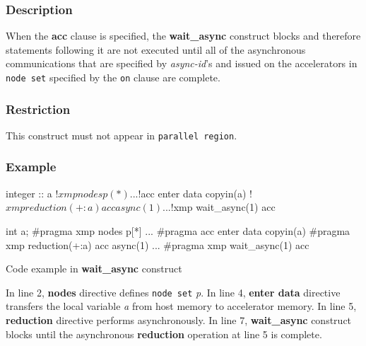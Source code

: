 \subsubsection*{Description}
When the {\bf acc} clause is specified,
the {\bf wait\_async} construct blocks and therefore
statements following it are not executed until all of the asynchronous
communications that are specified by {\it async-id}'s and issued on the accelerators in
{\tt node set} specified by the {\tt on} clause are complete.

\subsubsection*{Restriction}
This construct must not appear in {\OACC} {\tt parallel region}.

\subsubsection*{Example}
\begin{myfigure}
\begin{minipage}{0.45\hsize}
\begin{center}
\begin{XACCFexampleL}
integer :: a
!$xmp nodes p(*)
...
!$acc enter data copyin(a)
!$xmp reduction(+:a) acc async(1)
...
!$xmp wait_async(1) acc
\end{XACCFexampleL}
\end{center}
\end{minipage}
%
\begin{minipage}{0.53\hsize}
\begin{center}
\begin{XACCCexampleR}
int a;
#pragma xmp nodes p[*]
...
#pragma acc enter data copyin(a)
#pragma xmp reduction(+:a) acc async(1)
...
#pragma xmp wait_async(1) acc
\end{XACCCexampleR}
\end{center}
\end{minipage}
\caption{Code example in {\XACC} {\bf wait\_async} construct}\label{code:waitasync}
\end{myfigure}

In line 2,
{\XMP} {\bf nodes} directive defines {\tt node set} {\it p}.
In line 4,
{\OACC} {\bf enter data} directive transfers the local variable {\it a} from host memory to accelerator memory.
In line 5,
{\XACC} {\bf reduction} directive performs asynchronously.
In line 7,
{\XACC} {\bf wait\_async} construct blocks until the asynchronous {\bf reduction} operation at line 5 is complete.

